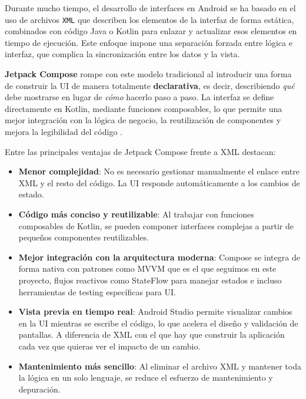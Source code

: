 Durante mucho tiempo, el desarrollo de interfaces en Android se ha basado en el uso de archivos \texttt{XML} que describen los elementos de la interfaz de forma estática, combinados con código Java o Kotlin para enlazar y actualizar esos elementos en tiempo de ejecución. Este enfoque impone una separación forzada entre lógica e interfaz, que complica la sincronización entre los datos y la vista.

\textbf{Jetpack Compose} rompe con este modelo tradicional al introducir una forma de construir la UI de manera totalmente \textbf{declarativa}, es decir, describiendo \textit{qué} debe mostrarse en lugar de \textit{cómo} hacerlo paso a paso. La interfaz se define directamente en Kotlin, mediante funciones composables, lo que permite una mejor integración con la lógica de negocio, la reutilización de componentes y mejora la legibilidad del código \cite{jetpack}.

Entre las principales ventajas de Jetpack Compose frente a XML destacan:

\begin{itemize}
    \item \textbf{Menor complejidad}: No es necesario gestionar manualmente el enlace entre XML y el resto del código. La UI responde automáticamente a los cambios de estado.

    \item \textbf{Código más conciso y reutilizable}: Al trabajar con funciones composables de Kotlin, se pueden componer interfaces complejas a partir de pequeños componentes reutilizables.

    \item \textbf{Mejor integración con la arquitectura moderna}: Compose se integra de forma nativa con patrones como MVVM que es el que seguimos en este proyecto, flujos reactivos como StateFlow para manejar estados e incluso herramientas de testing específicas para UI.

    \item \textbf{Vista previa en tiempo real}: Android Studio permite visualizar cambios en la UI mientras se escribe el código, lo que acelera el diseño y validación de pantallas. A diferencia de XML con el que hay que construir la aplicación cada vez que quieras ver el impacto de un cambio.

    \item \textbf{Mantenimiento más sencillo}: Al eliminar el archivo XML y mantener toda la lógica en un solo lenguaje, se reduce el esfuerzo de mantenimiento y depuración.
\end{itemize}

